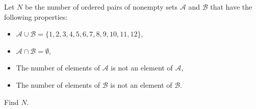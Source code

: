 Let $ N$ be the number of ordered pairs of nonempty sets $ \mathcal{A}$ and $ \mathcal{B}$ that have the following properties:

\begin{itemize}
	\item $ \mathcal{A} \cup \mathcal{B} = \{1,2,3,4,5,6,7,8,9,10,11,12\}$,
	\item $ \mathcal{A} \cap \mathcal{B} = \emptyset$,
	\item The number of elements of $ \mathcal{A}$ is not an element of $ \mathcal{A}$,
	\item The number of elements of $ \mathcal{B}$ is not an element of $ \mathcal{B}$.
\end{itemize}

Find $ N$.
